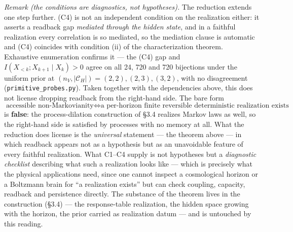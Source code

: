 \documentclass[
]{article}
\begin{document}
\emph{Remark (the conditions are diagnostics, not hypotheses).} The
reduction extends one step further. (C4) is not an independent condition
on the realization either: it asserts a readback gap \emph{mediated
through the hidden state}, and in a faithful realization every
correlation is so mediated, so the mediation clause is automatic and
(C4) coincides with condition (ii) of the characterization theorem.
Exhaustive enumeration confirms it --- the (C4) gap and
\(I(X_{<k}; X_{k+1} \mid X_k) > 0\) agree on all 24, 720 and 720
bijections under the uniform prior at
\((n_V, |\mathcal{C}_H|) = (2,2), (2,3), (3,2)\), with no disagreement
(\texttt{primitive\_probes.py}). Taken together with the dependencies
above, this does not license dropping readback from the right-hand side.
The bare form
\[\text{accessible non-Markovianity} \iff \text{a per-horizon finite reversible deterministic realization exists}\]
is \textbf{false}: the process-dilation construction of §3.4 realizes
Markov laws as well, so the right-hand side is satisfied by processes
with no memory at all. What the reduction does license is the
\emph{universal} statement --- the theorem above --- in which readback
appears not as a hypothesis but as an unavoidable feature of every
faithful realization. What C1--C4 supply is not hypotheses but a
\emph{diagnostic checklist} describing what such a realization looks
like --- which is precisely what the physical applications need, since
one cannot inspect a cosmological horizon or a Boltzmann brain for ``a
realization exists'' but can check coupling, capacity, readback and
persistence directly. The substance of the theorem lives in the
construction (§3.4) --- the response-table realization, the hidden space
growing with the horizon, the prior carried as realization datum --- and
is untouched by this reading.
\end{document}
